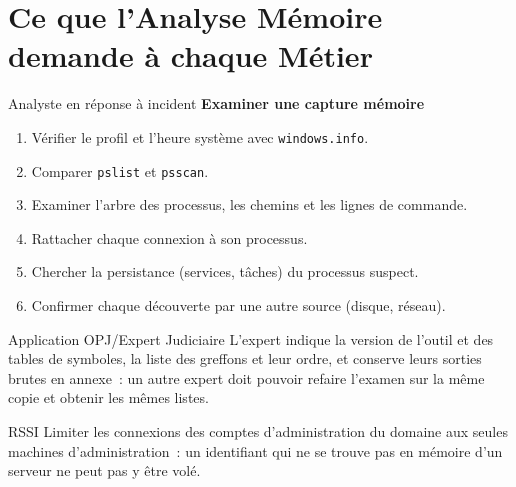 \section{Ce que l'Analyse Mémoire demande à chaque Métier}
\label{sec:c05-metiers}

\begin{boxmetier}{Analyste en réponse à incident}
\textbf{Examiner une capture mémoire}
\begin{enumerate}
    \item Vérifier le profil et l'heure système avec \texttt{windows.info}.
    \item Comparer \texttt{pslist} et \texttt{psscan}.
    \item Examiner l'arbre des processus, les chemins et les lignes de
          commande.
    \item Rattacher chaque connexion à son processus.
    \item Chercher la persistance (services, tâches) du processus suspect.
    \item Confirmer chaque découverte par une autre source (disque, réseau).
\end{enumerate}
\end{boxmetier}

\begin{boxmetier}{Application OPJ/Expert Judiciaire}
L'expert indique la version de l'outil et des tables de symboles, la liste
des greffons et leur ordre, et conserve leurs sorties brutes en annexe~: un
autre expert doit pouvoir refaire l'examen sur la même copie et obtenir les
mêmes listes.
\end{boxmetier}

\begin{boxmetier}{RSSI}
Limiter les connexions des comptes d'administration du domaine aux seules
machines d'administration~: un identifiant qui ne se trouve pas en mémoire
d'un serveur ne peut pas y être volé.
\end{boxmetier}

\separateur

